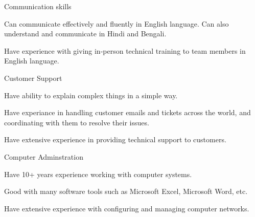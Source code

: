 

\begin{cventries}

  \cventry
    {} %
    {Communication skills} %
    {} %
    {} %
    {
      \begin{cvitems} %
        \item {Can communicate effectively and fluently in English language. Can also understand and communicate in Hindi and Bengali.}
        \item {Have experience with giving in-person technical training to team members in English language.}
      \end{cvitems}
    }

  \cventry
    {} %
    {Customer Support} %
    {} %
    {} %
    {
      \begin{cvitems} %
      	\item { Have ability to explain complex things in a simple way.}
        \item {Have experiance in handling customer emails and tickets across the world, and coordinating with them to resolve their issues.}
        \item {Have extensive experience in providing technical support to customers.}
      \end{cvitems}
    }

\cventry
{} %
{Computer Adminstration} %
{} %
{} %
{
	\begin{cvitems} %
		\item { Have 10+ years experience working with computer systems. }
		\item { Good with many software tools such as Microsoft Excel, Microsoft Word, etc.}
		\item { Have extensive experience with configuring and managing computer networks.}
	\end{cvitems}
}


\end{cventries}

